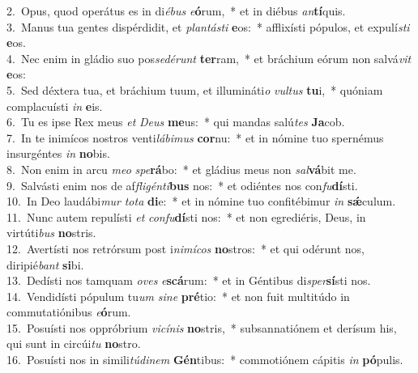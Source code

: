 {2.~}Opus, quod operátus es in di\textit{é}\textit{bus} \textit{e}\textbf{ó}rum,~* et in diébus \textit{an}\textbf{tí}quis.\\
{3.~}Manus tua gentes dispérdidit, et \textit{plan}\textit{tá}\textit{sti} \textbf{e}os:~* afflixísti pópulos, et expulí\textit{sti} \textbf{e}os.\\
{4.~}Nec enim in gládio suo pos\textit{se}\textit{dé}\textit{runt} \textbf{ter}ram,~* et bráchium eórum non salvá\textit{vit} \textbf{e}os:\\
{5.~}Sed déxtera tua, et bráchium tuum, et illumináti\textit{o} \textit{vul}\textit{tus} \textbf{tu}i,~* quóniam complacuísti \textit{in} \textbf{e}is.\\
{6.~}Tu es ipse Rex meus \textit{et} \textit{De}\textit{us} \textbf{me}us:~* qui mandas salú\textit{tes} \textbf{Ja}cob.\\
{7.~}In te inimícos nostros venti\textit{lá}\textit{bi}\textit{mus} \textbf{cor}nu:~* et in nómine tuo spernémus insurgéntes \textit{in} \textbf{no}bis.\\
{8.~}Non enim in arcu \textit{me}\textit{o} \textit{spe}\textbf{rá}bo:~* et gládius meus non \textit{sal}\textbf{vá}bit me.\\
{9.~}Salvásti enim nos de af\textit{fli}\textit{gén}\textit{ti}\textbf{bus} nos:~* et odiéntes nos con\textit{fu}\textbf{dí}sti.\\
{10.~}In Deo laudábi\textit{mur} \textit{to}\textit{ta} \textbf{di}e:~* et in nómine tuo confitébimur \textit{in} \textbf{sǽ}culum.\\
{11.~}Nunc autem repulísti \textit{et} \textit{con}\textit{fu}\textbf{dí}sti nos:~* et non egrediéris, Deus, in virtúti\textit{bus} \textbf{no}stris.\\
{12.~}Avertísti nos retrórsum post i\textit{ni}\textit{mí}\textit{cos} \textbf{no}stros:~* et qui odérunt nos, diripié\textit{bant} \textbf{si}bi.\\
{13.~}Dedísti nos tamquam \textit{o}\textit{ves} \textit{e}\textbf{scá}rum:~* et in Géntibus di\textit{sper}\textbf{sí}sti nos.\\
{14.~}Vendidísti pópulum tu\textit{um} \textit{si}\textit{ne} \textbf{pré}tio:~* et non fuit multitúdo in commutatiónibus \textit{e}\textbf{ó}rum.\\
{15.~}Posuísti nos oppróbrium \textit{vi}\textit{cí}\textit{nis} \textbf{no}stris,~* subsannatiónem et derísum his, qui sunt in circúi\textit{tu} \textbf{no}stro.\\
{16.~}Posuísti nos in simili\textit{tú}\textit{di}\textit{nem} \textbf{Gén}tibus:~* commotiónem cápitis \textit{in} \textbf{pó}pulis.\\
